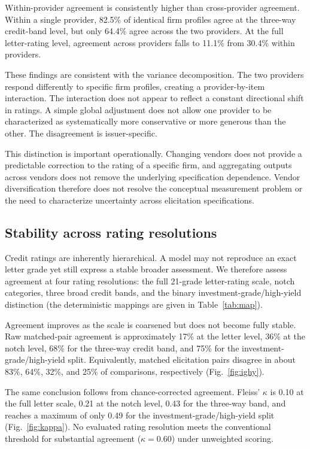 \documentclass[a4paper,fleqn]{cas-sc}
\begin{document}
Within-provider agreement is consistently higher than cross-provider agreement. Within a single provider,
82.5\% of identical firm profiles agree at the three-way credit-band level, but only 64.4\% agree across
the two providers. At the full letter-rating level, agreement across providers falls to 11.1\% from
30.4\% within providers.

These findings are consistent with the variance decomposition. The two providers respond differently to
specific firm profiles, creating a provider-by-item interaction. The interaction does not appear to
reflect a constant directional shift in ratings. A simple global adjustment does not allow one provider to
be characterized as systematically more conservative or more generous than the other. The disagreement is
issuer-specific.

This distinction is important operationally. Changing vendors does not provide a predictable correction
to the rating of a specific firm, and aggregating outputs across vendors does not remove the underlying
specification dependence. Vendor diversification therefore does not resolve the conceptual measurement
problem or the need to characterize uncertainty across elicitation specifications.

\subsection{Stability across rating resolutions}
Credit ratings are inherently hierarchical. A model may not reproduce an exact letter grade yet still
express a stable broader assessment. We therefore assess agreement at four rating resolutions: the full 21-grade letter-rating scale, notch categories, three broad credit bands, and the binary investment-grade/high-yield distinction (the deterministic mappings are given in Table~\ref{tab:map}).

Agreement improves as the scale is coarsened but does not become fully stable. Raw matched-pair agreement is approximately 17\% at the letter level, 36\% at the notch level, 68\% for the three-way
credit band, and 75\% for the investment-grade/high-yield split. Equivalently, matched elicitation pairs
disagree in about 83\%, 64\%, 32\%, and 25\% of comparisons, respectively (Fig.~\ref{fig:ighy}).

The same conclusion follows from chance-corrected agreement. Fleiss' $\kappa$ is 0.10 at the full letter
scale, 0.21 at the notch level, 0.43 for the three-way band, and reaches a maximum of only 0.49 for the
investment-grade/high-yield split (Fig.~\ref{fig:kappa}). No evaluated rating resolution meets the
conventional threshold for substantial agreement ($\kappa=0.60$) under unweighted scoring.
\end{document}
